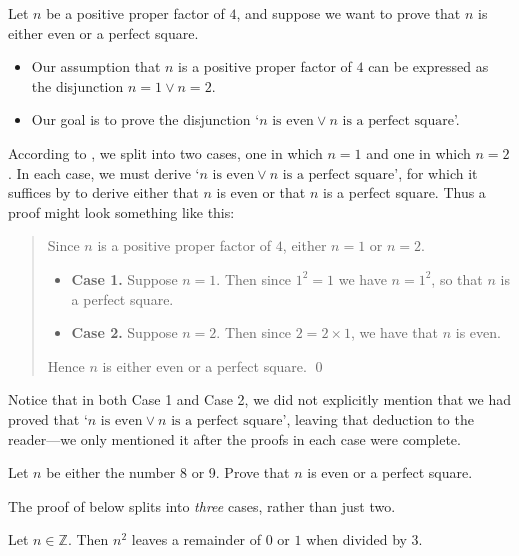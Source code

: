 \begin{example}
\label{exPositiveProperFactorOfFourEvenOrPerfectSquare}
Let $n$ be a positive proper factor of $4$, and suppose we want to prove that $n$ is either even or a perfect square.
\begin{itemize}
\item Our assumption that $n$ is a positive proper factor of $4$ can be expressed as the disjunction $n = 1 \vee n = 2$.
\item Our goal is to prove the disjunction `$n \text{ is even} \vee n \text{ is a perfect square}$'.
\end{itemize}

According to , we split into two cases, one in which $n=1$ and one in which $n=2$. In each case, we must derive `$n \text{ is even} \vee n \text{ is a perfect square}$', for which it suffices by  to derive either that $n$ is even or that $n$ is a perfect square. Thus a proof might look something like this:

\begin{quote}
Since $n$ is a positive proper factor of $4$, either $n=1$ or $n=2$.
\begin{itemize}
\item \textbf{Case 1.} Suppose $n=1$. Then since $1^2=1$ we have $n = 1^2$, so that $n$ is a perfect square.
\item \textbf{Case 2.} Suppose $n=2$. Then since $2 = 2 \times 1$, we have that $n$ is even.
\end{itemize}
Hence $n$ is either even or a perfect square. \qed
\end{quote}

Notice that in both Case 1 and Case 2, we did not explicitly mention that we had proved that `$n \text{ is even} \vee n \text{ is a perfect square}$', leaving that deduction to the reader---we only mentioned it after the proofs in each case were complete.
\end{example}

\begin{exercise}
  Let $n$ be either the number 8 or 9. Prove that $n$ is even or a perfect square.
\end{exercise}

The proof of  below splits into \textit{three} cases, rather than just two.

\begin{proposition}
\label{propRemainderOfSquaresModulo3}
Let $n \in \mathbb{Z}$. Then $n^2$ leaves a remainder of $0$ or $1$ when divided by $3$.
\end{proposition}


